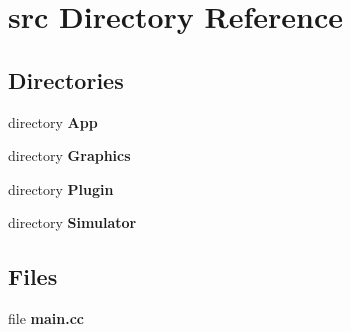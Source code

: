 \section{src Directory Reference}
\label{dir_68267d1309a1af8e8297ef4c3efbcdba}
\subsection*{Directories}
\begin{DoxyCompactItemize}
\item 
directory {\bf App}
\item 
directory {\bf Graphics}
\item 
directory {\bf Plugin}
\item 
directory {\bf Simulator}
\end{DoxyCompactItemize}
\subsection*{Files}
\begin{DoxyCompactItemize}
\item 
file {\bfseries main.\+cc}
\end{DoxyCompactItemize}
